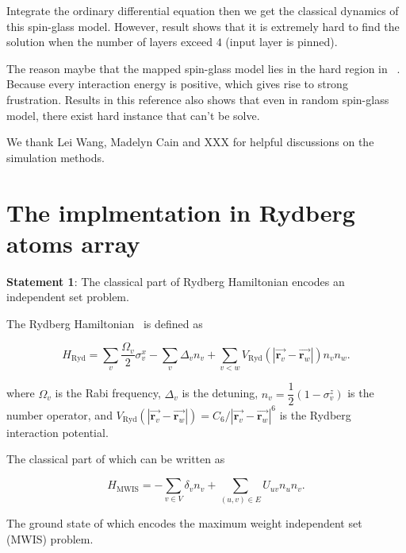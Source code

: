 \documentclass[twocolumn,superscriptaddress,english,showpacs,longbibliography]{revtex4-2}
\begin{document}
Integrate the ordinary differential equation then we get the classical
dynamics of this spin-glass model. However, result shows that it is
extremely hard to find the solution when the number of layers exceed
$4$ (input layer is pinned).

The reason maybe that the mapped spin-glass model lies in the hard
region in ~\cite{Wang2013}. Because every interaction energy is positive, which
gives rise to strong frustration. Results in this reference also shows that even in
random spin-glass model, there exist hard instance that can't be solve.

\begin{acknowledgments}
    We thank Lei Wang, Madelyn Cain and XXX for helpful discussions on the simulation methods.
\end{acknowledgments}

%


\newpage
\appendix

\section{The implmentation in Rydberg atoms array}\label{physical-model-rydberg-atoms-array}

\textbf{Statement 1}: The classical part of Rydberg Hamiltonian encodes
an independent set problem.

The Rydberg Hamiltonian~\cite{Nguyen2023} is defined as

\begin{equation}
    H_{\text{Ryd}} = \sum_v \dfrac{\Omega_v}{2} \sigma^x_v -\sum_v \Delta_v n_v + \sum_{v < w}  V_{\text{Ryd}}(|\overrightarrow{\mathbf{r}_v} -\overrightarrow{\mathbf{r}_w}|)n_v n_w.
\end{equation}

where $\Omega_v$ is the Rabi frequency, $\Delta_v$ is the detuning,
$n_v = \dfrac{1}{2}(1 - \sigma^z_v)$ is the number operator, and
$V_{\text{Ryd}}(|\overrightarrow{\mathbf{r}_v} - \overrightarrow{\mathbf{r}_w}|) = C_6/|\overrightarrow{\mathbf{r}_v} - \overrightarrow{\mathbf{r}_w}|^6$
is the Rydberg interaction potential.

The classical part of which can be written as

\begin{equation}
H_{\text{MWIS}} = -\sum_{v \in V}\delta_v n_v + \sum_{(u, v) \in E} U_{uv} n_u n_v.
\end{equation}

The ground state of which encodes the maximum weight independent set
(MWIS) problem.
\end{document}

